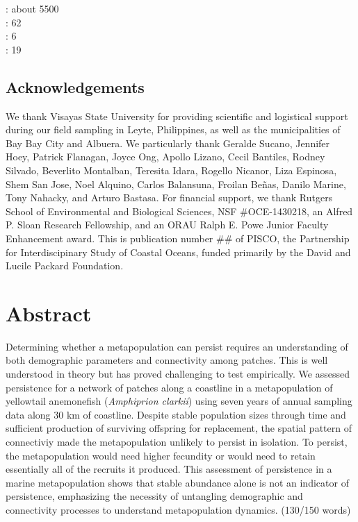 \documentclass[12pt, oneside]{article}   	%
\begin{document}
: about 5500 \\ 

: 62 \\ 

: 6 \\ 

: 19 \\ 

\subsection*{Acknowledgements}
We thank Visayas State University for providing scientific and logistical support during our field sampling in Leyte, Philippines, as well as the municipalities of Bay Bay City and Albuera. We particularly thank Geralde Sucano, Jennifer Hoey, Patrick Flanagan, Joyce Ong, Apollo Lizano, Cecil Bantiles, Rodney Silvado, Beverlito Montalban, Teresita Idara, Rogello Nicanor, Liza Espinosa, Shem San Jose, Noel Alquino, Carlos Balansuna, Froilan Beñas, Danilo Marine, Tony Nahacky, and Arturo Bastasa. For financial support, we thank Rutgers School of Environmental and Biological Sciences, NSF \#OCE-1430218, an Alfred P. Sloan Research Fellowship, and an ORAU Ralph E. Powe Junior Faculty Enhancement award. This is publication number \#\# of PISCO, the Partnership for Interdiscipinary Study of Coastal Oceans, funded primarily by the David and Lucile Packard Foundation.

\bigskip

\section*{Abstract}
Determining whether a metapopulation can persist requires an understanding of both demographic parameters and connectivity among patches. This is well understood in theory but has proved challenging to test empirically. We assessed persistence for a network of patches along a coastline in a metapopulation of yellowtail anemonefish (\textit{Amphiprion clarkii}) using seven years of annual sampling data along 30 km of coastline. Despite stable population sizes through time and sufficient production of surviving offspring for replacement, the spatial pattern of connectiviy made the metapopulation unlikely to persist in isolation. To persist, the metapopulation would need higher fecundity or would need to retain essentially all of the recruits it produced. This assessment of persistence in a marine metapopulation shows that stable abundance alone is not an indicator of persistence, emphasizing the necessity of untangling demographic and connectivity processes to understand metapopulation dynamics. (130/150 words) %
\end{document}
